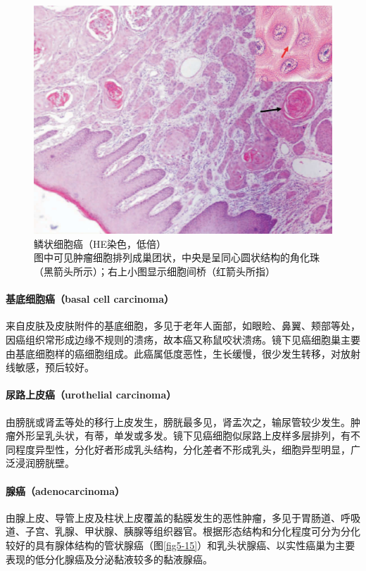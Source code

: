 \begin{figure}[!htbp]
  \centering
  \includegraphics{./images/Image00082.jpg}
  \captionsetup{justification=centering}
  \caption{鳞状细胞癌（HE染色，低倍）\\{\small 图中可见肿瘤细胞排列成巢团状，中央是呈同心圆状结构的角化珠（黑箭头所示）；右上小图显示细胞间桥（红箭头所指）}}
  \label{fig5-14}
\end{figure}



\paragraph{基底细胞癌（basal cell carcinoma）}
来自皮肤及皮肤附件的基底细胞，多见于老年人面部，如眼睑、鼻翼、颊部等处，因癌组织常形成边缘不规则的溃疡，故本癌又称鼠咬状溃疡。镜下见癌细胞巢主要由基底细胞样的癌细胞组成。此癌属低度恶性，生长缓慢，很少发生转移，对放射线敏感，预后较好。

\paragraph{尿路上皮癌（urothelial carcinoma）}
由膀胱或肾盂等处的移行上皮发生，膀胱最多见，肾盂次之，输尿管较少发生。肿瘤外形呈乳头状，有蒂，单发或多发。镜下见癌细胞似尿路上皮样多层排列，有不同程度异型性，分化好者形成乳头结构，分化差者不形成乳头，细胞异型明显，广泛浸润膀胱壁。

\paragraph{腺癌（adenocarcinoma）}
由腺上皮、导管上皮及柱状上皮覆盖的黏膜发生的恶性肿瘤，多见于胃肠道、呼吸道、子宫、乳腺、甲状腺、胰腺等组织器官。根据形态结构和分化程度可分为分化较好的具有腺体结构的管状腺癌（图\ref{fig5-15}）和乳头状腺癌、以实性癌巢为主要表现的低分化腺癌及分泌黏液较多的黏液腺癌。

